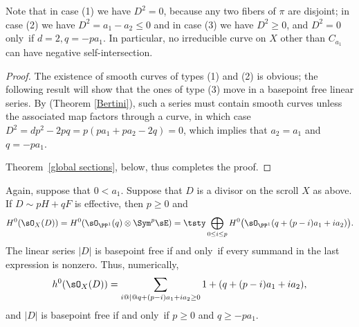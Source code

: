 Note that in case (1) we have $D^{2} = 0$, because any two fibers of $\pi$
are disjoint; in case (2) we have $D^{2}= a_{1}-a_{2}\leq 0$ and in case
(3) we have $D^{2}\geq 0$, and $D^2=0$ only~if
$d=2, q = -pa_1$. In particular, no irreducible curve
on $X$ other than $C_{a_1}$ can have negative self-intersection.

\begin{proof}
The existence of smooth curves of types (1) and (2) is obvious; the following
result will show that
the ones of type (3) move in a basepoint free linear series. By 
%
(Theorem \ref{Bertini}), such a series must contain smooth curves unless the
associated map factors through a curve, in which case $D^2 = dp^2-2pq =
p(pa_1+pa_2 -2 q) = 0$, which implies that $a_2=a_1$ and $q= -pa_1$.

Theorem~\ref{global sections}, below, thus completes the proof.
\end{proof}

\begin{theorem}\label{global sections} Again, suppose that $0<a_{1}$.
Suppose that $D$ is a divisor on the scroll $X$ as above. If $D \sim
pH+qF$ is effective,  then $p\geq 0$ and
$$
H^{0}(\sO_{X}(D)) = H^{0}(\sO_{\PP^{1}}(q) \otimes \Sym^{p} \sE)
=
\tsty\bigoplus\limits_{0\leq i\leq p}H^{0}\bigl(\sO_{\PP^{1}}(q + (p-i)a_{1}+i
a_{2})\bigr).
$$
The linear series $|D|$ is basepoint free if and only~if every summand
%
in the last expression is nonzero.
Thus, numerically,
$$
h^{0}(\sO_{X}(D)) =
\sum_{i @\mid@ q+(p-i)a_{1}+i a_{2} \geq 0}1+(q + (p-i)a_{1}+i a_{2}),
$$
and
$|D|$ is basepoint free if and only~if $p\geq 0$ and $q\geq -pa_{1}$.
\unif
\end{theorem}

